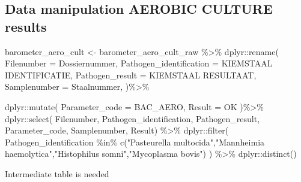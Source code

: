 \documentclass[
]{article}
\newenvironment{Shaded}{\begin{snugshade}}{\end{snugshade}}
\newcommand{\AttributeTok}[1]{\textcolor[rgb]{0.77,0.63,0.00}{#1}}
\newcommand{\FunctionTok}[1]{\textcolor[rgb]{0.00,0.00,0.00}{#1}}
\newcommand{\NormalTok}[1]{#1}
\newcommand{\OtherTok}[1]{\textcolor[rgb]{0.56,0.35,0.01}{#1}}
\newcommand{\SpecialCharTok}[1]{\textcolor[rgb]{0.00,0.00,0.00}{#1}}
\newcommand{\StringTok}[1]{\textcolor[rgb]{0.31,0.60,0.02}{#1}}
\begin{document}
\hypertarget{data-manipulation-aerobic-culture-results}{%
\subsection{Data manipulation AEROBIC CULTURE
results}\label{data-manipulation-aerobic-culture-results}}

\begin{Shaded}
\begin{Highlighting}[]
\NormalTok{barometer\_aero\_cult }\OtherTok{\textless{}{-}}\NormalTok{ barometer\_aero\_cult\_raw }\SpecialCharTok{\%\textgreater{}\%}
\NormalTok{  dplyr}\SpecialCharTok{::}\FunctionTok{rename}\NormalTok{(}
    \AttributeTok{Filenumber =}\NormalTok{ Dossiernummer,}
    \AttributeTok{Pathogen\_identification =} \StringTok{\textquotesingle{}KIEMSTAAL IDENTIFICATIE\textquotesingle{}}\NormalTok{,}
    \AttributeTok{Pathogen\_result =} \StringTok{\textquotesingle{}KIEMSTAAL RESULTAAT\textquotesingle{}}\NormalTok{,}
    \AttributeTok{Samplenumber =} \StringTok{\textquotesingle{}Staalnummer\textquotesingle{}}\NormalTok{, }
\NormalTok{  )}\SpecialCharTok{\%\textgreater{}\%}
  
\NormalTok{  dplyr}\SpecialCharTok{::}\FunctionTok{mutate}\NormalTok{(}
    \AttributeTok{Parameter\_code =} \StringTok{\textquotesingle{}BAC\_AERO\textquotesingle{}}\NormalTok{,}
    \AttributeTok{Result =} \StringTok{\textquotesingle{}OK\textquotesingle{}}
\NormalTok{  )}\SpecialCharTok{\%\textgreater{}\%}
\NormalTok{  dplyr}\SpecialCharTok{::}\FunctionTok{select}\NormalTok{(}
\NormalTok{    Filenumber,}
\NormalTok{    Pathogen\_identification,}
\NormalTok{    Pathogen\_result,}
\NormalTok{    Parameter\_code,}
\NormalTok{    Samplenumber,}
\NormalTok{    Result)  }\SpecialCharTok{\%\textgreater{}\%}
\NormalTok{  dplyr}\SpecialCharTok{::}\FunctionTok{filter}\NormalTok{(}
\NormalTok{    Pathogen\_identification }\SpecialCharTok{\%in\%} \FunctionTok{c}\NormalTok{(}\StringTok{"Pasteurella multocida"}\NormalTok{,}\StringTok{"Mannheimia haemolytica"}\NormalTok{,}\StringTok{"Histophilus somni"}\NormalTok{,}\StringTok{"Mycoplasma bovis"}\NormalTok{)}
\NormalTok{  ) }\SpecialCharTok{\%\textgreater{}\%}
\NormalTok{  dplyr}\SpecialCharTok{::}\FunctionTok{distinct}\NormalTok{()}
\end{Highlighting}
\end{Shaded}

Intermediate table is needed
\end{document}
